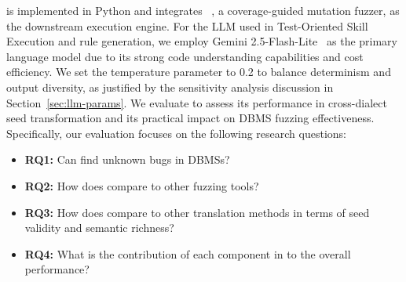 \documentclass[conference]{IEEEtran}
\begin{document}
\tool{} is implemented in Python and integrates \griffin{}~\cite{fu2022griffin}, a coverage-guided mutation fuzzer, as the downstream execution engine. For the LLM used in Test-Oriented Skill Execution and rule generation, we employ Gemini 2.5-Flash-Lite~\cite{gemini-2.5-flash} as the primary language model due to its strong code understanding capabilities and cost efficiency. We set the temperature parameter to 0.2 to balance determinism and output diversity, as justified by the sensitivity analysis discussion in Section~\ref{sec:llm-params}.
We evaluate \tool{} to assess its performance in cross-dialect seed transformation and its practical impact on DBMS fuzzing effectiveness. Specifically, our evaluation focuses on the following research questions:
\begin{itemize}[leftmargin=*]
\item \textbf{RQ1:} Can \tool{} find unknown bugs in DBMSs?
\item \textbf{RQ2:} How does \tool{} compare to other fuzzing tools?
\item \textbf{RQ3:} How does \tool{} compare to other translation methods in terms of seed validity and semantic richness?
\item \textbf{RQ4:} What is the contribution of each component in \tool{} to the overall performance?
\end{itemize}

\end{document}
